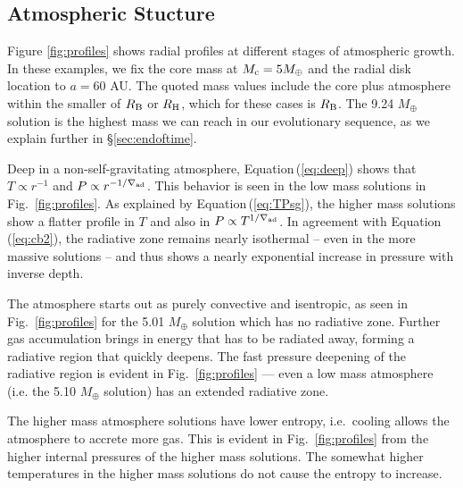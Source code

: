 \documentclass[apj, numberedappendix]{emulateapj}
\newcommand{\Eq}[1]{Equation\,(\ref{#1})}
\newcommand{\Fig}[1]{Fig.~\ref{#1}}
\newcommand{\delad}{\nabla_{\rm ad}}
\newcommand{\RB}{R_{\rm B}}
\newcommand{\RH}{R_{\rm H}}
\begin{document}
\subsection{Atmospheric Stucture}
\label{sec:profiles}
Figure \ref{fig:profiles} shows radial profiles at different stages of atmospheric growth.  In these examples, we fix the core mass at $M_{\rm{c}}=5 M_{\oplus}$ and the radial disk location to $a=60$ AU.  The quoted mass values include the core plus atmosphere within the smaller of $\RB$ or $\RH$, which for these cases is $\RB$.  The 9.24 $M_{\oplus}$ solution is the highest mass we can reach in our evolutionary sequence, as we explain further in \S\ref{sec:endoftime}.

Deep in a non-self-gravitating atmosphere, \Eq{eq:deep} shows that $T \propto r^{-1}$ and $P\propto r^{-1/\delad}$.  This behavior is seen in the low mass solutions in \Fig{fig:profiles}.  As explained by \Eq{eq:TPsg}, the higher mass solutions show a flatter profile in $T$ and also in $P \propto T^{1/\delad}$.  In agreement with \Eq{eq:cb2}, the radiative zone remains nearly isothermal -- even in the more massive solutions -- and thus shows a nearly exponential increase in pressure with inverse depth.  

The atmosphere starts out as purely convective and isentropic, as seen in \Fig{fig:profiles} for the 5.01 $M_{\oplus}$ solution which has no radiative zone. Further gas accumulation brings in energy that has to be radiated away, forming a radiative region that quickly deepens. The fast pressure deepening of the radiative region is evident in \Fig{fig:profiles} --- even a low mass atmosphere (i.e. the 5.10 $M_{\oplus}$ solution) has an extended radiative zone. 
 
The higher mass atmosphere solutions have lower entropy, i.e.\ cooling allows the atmosphere to accrete more gas.  This is evident in \Fig{fig:profiles} from the higher internal pressures of the higher mass solutions.  The somewhat higher temperatures in the higher mass solutions do not cause the entropy to increase.

\end{document}
